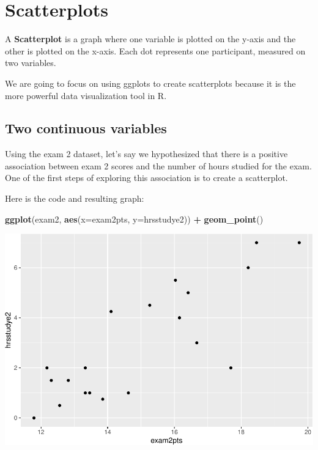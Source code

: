 \documentclass[
]{book}
\newenvironment{Shaded}{\begin{snugshade}}{\end{snugshade}}
\newcommand{\DataTypeTok}[1]{\textcolor[rgb]{0.13,0.29,0.53}{#1}}
\newcommand{\KeywordTok}[1]{\textcolor[rgb]{0.13,0.29,0.53}{\textbf{#1}}}
\newcommand{\NormalTok}[1]{#1}
\newcommand{\OperatorTok}[1]{\textcolor[rgb]{0.81,0.36,0.00}{\textbf{#1}}}
\newcommand{\StringTok}[1]{\textcolor[rgb]{0.31,0.60,0.02}{#1}}
\begin{document}
\hypertarget{scatterplots}{%
\section{Scatterplots}\label{scatterplots}}

A \textbf{Scatterplot} is a graph where one variable is plotted on the y-axis and the other is plotted on the x-axis. Each dot represents one participant, measured on two variables.

We are going to focus on using ggplots to create scatterplots because it is the more powerful data visualization tool in R.

\hypertarget{two-continuous-variables}{%
\subsection{Two continuous variables}\label{two-continuous-variables}}

Using the exam 2 dataset, let's say we hypothesized that there is a positive association between exam 2 scores and the number of hours studied for the exam. One of the first steps of exploring this association is to create a scatterplot.

Here is the code and resulting graph:

\begin{Shaded}
\begin{Highlighting}[]
\KeywordTok{ggplot}\NormalTok{(exam2, }\KeywordTok{aes}\NormalTok{(}\DataTypeTok{x=}\NormalTok{exam2pts, }\DataTypeTok{y=}\NormalTok{hrsstudye2)) }\OperatorTok{+}
\StringTok{  }\KeywordTok{geom_point}\NormalTok{()}
\end{Highlighting}
\end{Shaded}

\includegraphics{Tools-for-working-with-data-211_files/figure-latex/unnamed-chunk-2-1.pdf}
\end{document}
